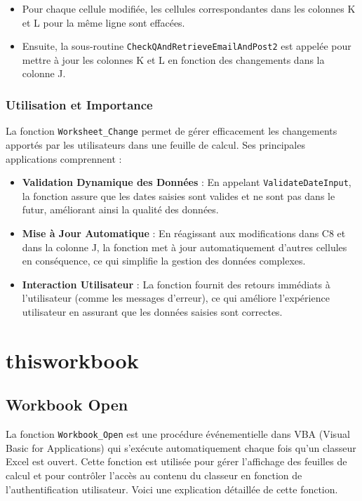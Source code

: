 \documentclass[a4paper, oneside, 12pt, final]{extreport}
\begin{document}
\begin{itemize}
    \item Pour chaque cellule modifiée, les cellules correspondantes dans les colonnes K et L pour la même ligne sont effacées.
    \item Ensuite, la sous-routine \texttt{CheckQAndRetrieveEmailAndPost2} est appelée pour mettre à jour les colonnes K et L en fonction des changements dans la colonne J.
\end{itemize}

\subsubsection{Utilisation et Importance}

La fonction \texttt{Worksheet\_Change} permet de gérer efficacement les changements apportés par les utilisateurs dans une feuille de calcul. Ses principales applications comprennent :

\begin{itemize}
    \item \textbf{Validation Dynamique des Données} : En appelant \texttt{ValidateDateInput}, la fonction assure que les dates saisies sont valides et ne sont pas dans le futur, améliorant ainsi la qualité des données.
    \item \textbf{Mise à Jour Automatique} : En réagissant aux modifications dans C8 et dans la colonne J, la fonction met à jour automatiquement d'autres cellules en conséquence, ce qui simplifie la gestion des données complexes.
    \item \textbf{Interaction Utilisateur} : La fonction fournit des retours immédiats à l'utilisateur (comme les messages d'erreur), ce qui améliore l'expérience utilisateur en assurant que les données saisies sont correctes.
\end{itemize}
 \section{thisworkbook}
 \subsection{Workbook Open}

La fonction \texttt{Workbook\_Open} est une procédure événementielle dans VBA (Visual Basic for Applications) qui s'exécute automatiquement chaque fois qu'un classeur Excel est ouvert. Cette fonction est utilisée pour gérer l'affichage des feuilles de calcul et pour contrôler l'accès au contenu du classeur en fonction de l'authentification utilisateur. Voici une explication détaillée de cette fonction.
\end{document}

